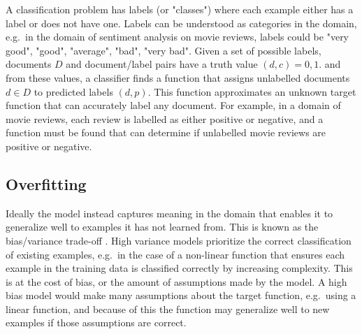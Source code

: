  A classification problem has  labels (or "classes") where each example either has  a label or does not have one. Labels can be understood as categories in the domain, e.g.\ in the domain of sentiment analysis on movie reviews, labels could be "very good", "good", "average", "bad", "very bad". Given a set of possible labels, documents $D$ and document/label pairs have a truth value $(d, c) = {0, 1}$.  and from these values, a classifier finds a function that assigns unlabelled documents $d \in D$ to predicted labels $(d, p) $. This function approximates an unknown target function that can accurately label any document. For example, in a domain of movie reviews, each review is labelled as either positive or negative, and a function must be found that can determine if unlabelled movie reviews are positive or negative. 



\subsection{Overfitting} \label{overfittingch2} %


  Ideally the model instead captures meaning in the domain that enables it to generalize well to examples it has not learned from.  This is known as the bias/variance trade-off . High variance models prioritize the correct classification of existing examples, e.g.\ in the case of a non-linear function that ensures each example in the training data is classified correctly by increasing complexity. This is at the cost of bias, or the amount of assumptions made by the model. A high bias model would make many assumptions about the target function, e.g.\ using a linear function, and because of this the function may generalize well to new examples if those assumptions are correct.

